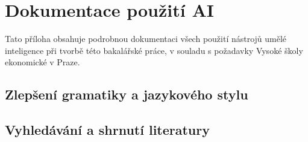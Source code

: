 
\chapter{Dokumentace použití AI}
\label{app:ai-log}

Tato příloha obsahuje podrobnou dokumentaci všech použití nástrojů umělé inteligence 
při tvorbě této bakalářské práce, v souladu s požadavky Vysoké školy ekonomické v Praze.

\newcommand{\logentry}[7]{%
  \noindent\rule{\textwidth}{0.4pt}
  \begin{description}[leftmargin=!, labelwidth=3.5cm, font=\normalfont\bfseries]
    \item[Datum a čas:] #1
    \item[AI nástroj:] #2
    \item[Soubor(y):] \texttt{#3}
    \item[Účel použití:] #4
    \item[Vstupní data:] #5
    \item[Výstup AI:] #6
    \item[Vlastní přínos:] #7
  \end{description}
  \vspace{0.5em}
}


\section{Zlepšení gramatiky a jazykového stylu}
\label{sec:ai-gramatika}


\section{Vyhledávání a shrnutí literatury}
\label{sec:ai-literatura}


